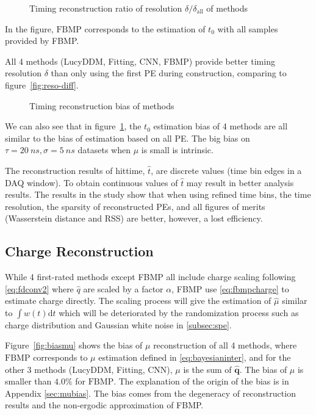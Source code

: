 \begin{figure}[H]
    \centering
    \resizebox{\textwidth}{!}{}
    \caption{\label{fig:deltamethods} Timing reconstruction ratio of resolution $\delta/\delta_{\mathrm{all}}$ of methods}
\end{figure}

In the figure, $\mathrm{FBMP}$ corresponds to the estimation of $t_{0}$ with all samples provided by FBMP. 

All 4 methods (LucyDDM, Fitting, CNN, FBMP) provide better timing resolution $\delta$ than only using the first PE during construction, comparing to figure~\ref{fig:reso-diff}. 

\begin{figure}[H]
    \centering
    \resizebox{\textwidth}{!}{}
    \caption{\label{fig:biasmethods}Timing reconstruction bias of methods}
\end{figure}

We can also see that in figure~\ref{fig:deltamethods}, the $t_0$ estimation bias of 4 methods are all similar to the bias of estimation based on all PE. The big bias on $\tau=\SI{20}{ns}, \sigma=\SI{5}{ns}$ datasets when $\mu$ is small is intrinsic. 


The reconstruction results of hittime, $\hat{t}$, are discrete values (time bin edges in a DAQ window). To obtain continuous values of $\hat{t}$ may result in better analysis results. The results in the study show that when using refined time bins, the time resolution, the sparsity of reconstructed PEs, and all figures of merits (Wasserstein distance and RSS) are better, however, a lost efficiency. 

\subsection{Charge Reconstruction}
\label{subsec:chargereconstruction}

While 4 first-rated methods except FBMP all include charge scaling following \eqref{eq:fdconv2} where $\hat{q}$ are scaled by a factor $\alpha$, FBMP use \eqref{eq:fbmpcharge} to estimate charge directly. The scaling process will give the estimation of $\hat{\mu}$ similar to $\int w(t)\mathrm{d}t$ which will be deteriorated by the randomization process such as charge distribution and Gaussian white noise in \ref{subsec:spe}. 

Figure~\ref{fig:biasmu} shows the bias of $\mu$ reconstruction of all 4 methods, where $\mathrm{FBMP}$ corresponds to $\mu$ estimation defined in \eqref{eq:bayesianinter}, and for the other 3 methods (LucyDDM, Fitting, CNN), $\mu$ is the sum of $\hat{\bm{q}}$. The bias of $\mu$ is smaller than $4.0\%$ for $\mathrm{FBMP}$. The explanation of the origin of the bias is in Appendix \ref{sec:mubias}. The bias comes from the degeneracy of reconstruction results and the non-ergodic approximation of FBMP. 

